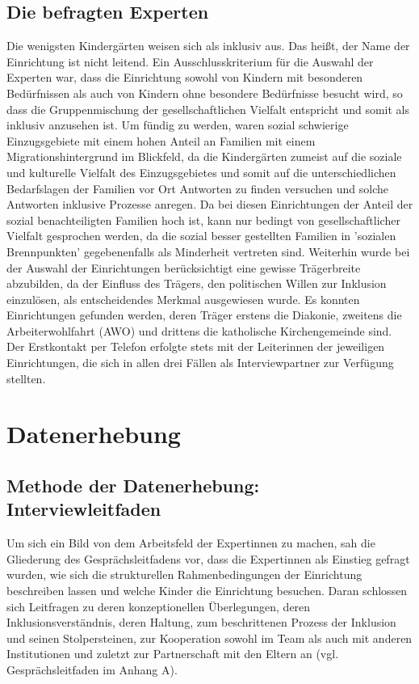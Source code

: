\subsection{Die befragten Experten}
Die wenigsten Kindergärten weisen sich als inklusiv aus. Das heißt, der Name der Einrichtung ist nicht leitend. Ein Ausschlusskriterium für die Auswahl der Experten war, dass die Einrichtung sowohl von Kindern mit besonderen Bedürfnissen als auch von Kindern ohne besondere Bedürfnisse besucht wird, so dass die Gruppenmischung der gesellschaftlichen Vielfalt entspricht und somit als inklusiv anzusehen ist. Um fündig zu werden, waren sozial schwierige Einzugsgebiete mit einem hohen Anteil an Familien mit einem Migrationshintergrund im Blickfeld, da die Kindergärten zumeist auf die soziale und kulturelle Vielfalt des Einzugsgebietes und somit auf die unterschiedlichen Bedarfslagen der Familien vor Ort Antworten zu finden versuchen und solche Antworten inklusive Prozesse anregen. Da bei diesen Einrichtungen der Anteil der sozial benachteiligten Familien hoch ist, kann nur bedingt von gesellschaftlicher Vielfalt gesprochen werden, da die sozial besser gestellten Familien in ’sozialen Brennpunkten’ gegebenenfalls als Minderheit vertreten sind.    
Weiterhin wurde bei der Auswahl der Einrichtungen berücksichtigt eine gewisse Trägerbreite abzubilden, da der Einfluss des Trägers, den politischen Willen zur Inklusion einzulösen, als entscheidendes Merkmal ausgewiesen wurde. Es konnten Einrichtungen gefunden werden, deren Träger erstens die Diakonie, zweitens die Arbeiterwohlfahrt (AWO) und drittens die katholische Kirchengemeinde sind. Der Erstkontakt per Telefon erfolgte stets mit der Leiterinnen der jeweiligen Einrichtungen, die sich in allen drei Fällen als Interviewpartner zur Verfügung stellten.

\section{Datenerhebung}
\subsection{Methode der Datenerhebung: Interviewleitfaden}
Um sich ein Bild von dem Arbeitsfeld der Expertinnen zu machen, sah die Gliederung des Gesprächsleitfadens vor, dass die Expertinnen als Einstieg gefragt wurden, wie sich die strukturellen Rahmenbedingungen der Einrichtung beschreiben lassen und welche Kinder die Einrichtung besuchen. Daran schlossen sich Leitfragen zu deren konzeptionellen Überlegungen, deren Inklusionsverständnis, deren Haltung, zum beschrittenen Prozess der Inklusion und seinen Stolpersteinen, zur Kooperation sowohl im Team als auch mit anderen Institutionen und zuletzt zur Partnerschaft mit den Eltern an (vgl. Gesprächsleitfaden im Anhang A).

